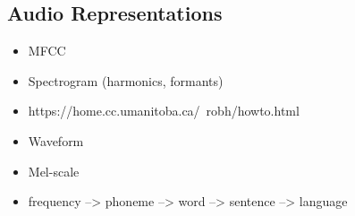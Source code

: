 \subsection{Audio Representations}
\label{sec:audio_representations}
    \begin{itemize}
        \item MFCC
        \item Spectrogram (harmonics, formants)
        \item https://home.cc.umanitoba.ca/~robh/howto.html
        \item Waveform
        \item Mel-scale
        \item frequency --> phoneme --> word --> sentence --> language
    \end{itemize}